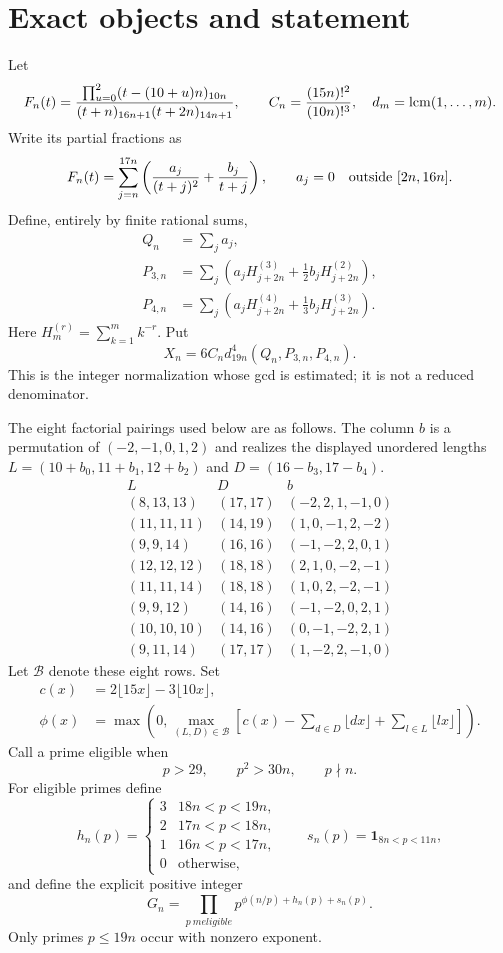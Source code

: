 \documentclass[11pt]{article}
\begin{document}
\section{Exact objects and statement}
Let
\[
 F_n(t)=\frac{\prod_{u=0}^2(t-(10+u)n)_{10n}}
 {(t+n)_{16n+1}(t+2n)_{14n+1}},\qquad
 C_n=\frac{(15n)!^2}{(10n)!^3},\quad
 d_m=\mathop{\rm lcm}(1,\ldots,m).
\]
Write its partial fractions as
\[
 F_n(t)=\sum_{j=n}^{17n}\left(\frac{a_j}{(t+j)^2}+\frac{b_j}{t+j}\right),
 \qquad a_j=0\quad\hbox{outside }[2n,16n].
\]
Define, entirely by finite rational sums,
\begin{align}
 Q_n&=\sum_j a_j,\nonumber\\
 P_{3,n}&=\sum_j\left(a_jH^{(3)}_{j+2n}+\tfrac12 b_jH^{(2)}_{j+2n}\right),\label{arith-readout}\\
 P_{4,n}&=\sum_j\left(a_jH^{(4)}_{j+2n}+\tfrac13 b_jH^{(3)}_{j+2n}\right).\nonumber
\end{align}
Here $H_m^{(r)}=\sum_{k=1}^m k^{-r}$. Put
\[
 X_n=6C_nd_{19n}^4(Q_n,P_{3,n},P_{4,n}).
\]
This is the integer normalization whose gcd is estimated; it is not a
reduced denominator.

The eight factorial pairings used below are as follows. The column $b$
is a permutation of $(-2,-1,0,1,2)$ and realizes the displayed unordered
lengths $L=(10+b_0,11+b_1,12+b_2)$ and $D=(16-b_3,17-b_4)$.
\[
\begin{array}{c|c|c}
L&D&b\\\hline
(8,13,13)&(17,17)&(-2,2,1,-1,0)\\
(11,11,11)&(14,19)&(1,0,-1,2,-2)\\
(9,9,14)&(16,16)&(-1,-2,2,0,1)\\
(12,12,12)&(18,18)&(2,1,0,-2,-1)\\
(11,11,14)&(18,18)&(1,0,2,-2,-1)\\
(9,9,12)&(14,16)&(-1,-2,0,2,1)\\
(10,10,10)&(14,16)&(0,-1,-2,2,1)\\
(9,11,14)&(17,17)&(1,-2,2,-1,0)
\end{array}
\]
Let $\mathcal B$ denote these eight rows. Set
\begin{align*}
 c(x)&=2\lfloor15x\rfloor-3\lfloor10x\rfloor,\\
 \phi(x)&=\max\left(0,\max_{(L,D)\in\mathcal B}
 \left[c(x)-\sum_{d\in D}\lfloor dx\rfloor+
                  \sum_{l\in L}\lfloor lx\rfloor\right]\right).
\end{align*}
Call a prime eligible when
\[
 p>29,\qquad p^2>30n,\qquad p\nmid n.
\]
For eligible primes define
\[
 h_n(p)=\begin{cases}3&18n<p<19n,\\2&17n<p<18n,\\
 1&16n<p<17n,\\0&\text{otherwise},\end{cases}
 \qquad s_n(p)=\mathbf1_{8n<p<11n},
\]
and define the explicit positive integer
\begin{equation}\label{arith-G}
 G_n=\prod_{p\ {
m eligible}}p^{\phi(n/p)+h_n(p)+s_n(p)}.
\end{equation}
Only primes $p\leq19n$ occur with nonzero exponent.
\end{document}
